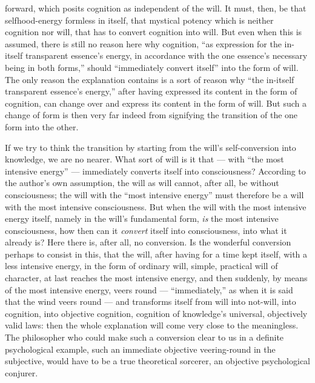 \documentclass[12pt]{book}
\newcommand{\opage}[1]{\marginnote{\footnotesize\textit{[#1]}}}
\begin{document}
forward, which posits cognition as independent of the will. It must, then,
be that selfhood-energy formless in itself, that mystical potency which is
neither cognition nor will, that has to convert cognition into will. But
even when this is assumed, there is still no reason here why cognition, ``as
expression for the in-itself transparent essence's energy, in accordance
with the one essence's necessary being in both forms,'' should ``immediately
convert itself'' into the form of will. The only reason the explanation
contains is a sort of reason why ``the in-itself transparent essence's
energy,'' after having expressed its content in the form of cognition, can
change over and express its content in the form of will. But such a change of
form is then very far indeed from signifying the transition of the one form
into the other.

If we try to think the transition by starting from the will's
self-conversion into knowledge, we are no nearer. What sort of will is it
that --- with ``the most intensive energy'' --- immediately converts itself
into consciousness? According to the author's own assumption, the will as
will cannot, after all, be without consciousness; the will with the ``most
intensive energy'' must therefore be a will with the
\opage{42}\setcounter{footnote}{0}%
most intensive consciousness. But when the will with the most intensive
energy itself, namely in the will's fundamental form, \emph{is} the most
intensive consciousness, how then can it \emph{convert} itself into
consciousness, into what it already is? Here there is, after all, no
conversion. Is the wonderful conversion perhaps to consist in this, that the
will, after having for a time kept itself, with a less intensive energy, in
the form of ordinary will, simple, practical will of character, at last
reaches the most intensive energy, and then suddenly, by means of the most
intensive energy, veers round --- ``immediately,'' as when it is said that
the wind veers round --- and transforms itself from will into not-will, into
cognition, into objective cognition, cognition of knowledge's universal,
objectively valid laws: then the whole explanation will come very close to
the meaningless. The philosopher who could make such a conversion clear to
us in a definite psychological example, such an immediate objective
veering-round in the subjective, would have to be a true theoretical
sorcerer, an objective psychological conjurer.
\end{document}
